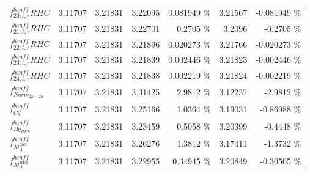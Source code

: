 \begin{table}
\begin{tabular}{| l | r | r | r  r | r  r |}
                                                      $f_{20; t, r}^{banff} RHC$ &         3.11707 & 3.21831 & 3.22095 &        0.081949 \%  &         3.21567 &       -0.081949 \%  \\ 
                                                      $f_{21; t, r}^{banff} RHC$ &         3.11707 & 3.21831 & 3.22701 &          0.2705 \%  &          3.2096 &         -0.2705 \%  \\ 
                                                      $f_{22; t, r}^{banff} RHC$ &         3.11707 & 3.21831 & 3.21896 &        0.020273 \%  &         3.21766 &       -0.020273 \%  \\ 
                                                      $f_{23; t, r}^{banff} RHC$ &         3.11707 & 3.21831 & 3.21839 &        0.002446 \%  &         3.21823 &       -0.002446 \%  \\ 
                                                      $f_{24; t, r}^{banff} RHC$ &         3.11707 & 3.21831 & 3.21838 &        0.002219 \%  &         3.21824 &       -0.002219 \%  \\ 
                                                        $f_{Norm_{2p-2h}}^{banff}$ &         3.11707 & 3.21831 & 3.31425 &          2.9812 \%  &         3.12237 &         -2.9812 \%  \\ 
                                                         $f_{C^{A}_{5}}^{banff}$ &         3.11707 & 3.21831 & 3.25166 &          1.0364 \%  &         3.19031 &        -0.86988 \%  \\ 
                                                          $f_{Bg_{RES}}^{banff}$ &         3.11707 & 3.21831 & 3.23459 &          0.5058 \%  &         3.20399 &         -0.4448 \%  \\ 
                                                          $f_{M_A^{QE}}^{banff}$ &         3.11707 & 3.21831 & 3.26276 &          1.3812 \%  &         3.17411 &         -1.3732 \%  \\ 
                                                         $f_{M_A^{RES}}^{banff}$ &         3.11707 & 3.21831 & 3.22955 &         0.34945 \%  &         3.20849 &        -0.30505 \%  \\ 

\end{tabular}
\end{table}
